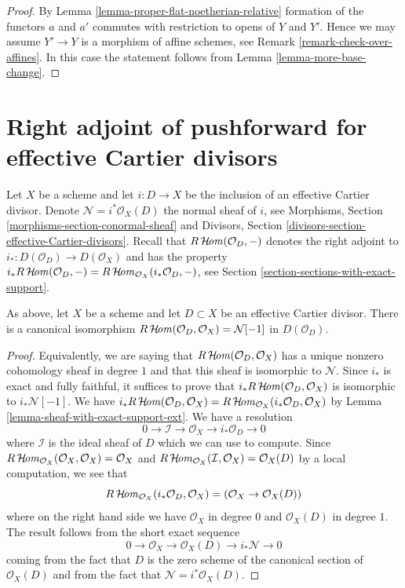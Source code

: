 \begin{proof}
By Lemma \ref{lemma-proper-flat-noetherian-relative} formation of the
functors $a$ and $a'$ commutes with restriction to opens of $Y$ and $Y'$.
Hence we may assume $Y' \to Y$ is a morphism of affine schemes, see
Remark \ref{remark-check-over-affines}. In this
case the statement follows from Lemma \ref{lemma-more-base-change}.
\end{proof}



\section{Right adjoint of pushforward for effective Cartier divisors}
\label{section-dualizing-Cartier}

\noindent
Let $X$ be a scheme and let $i : D \to X$ be the inclusion of an
effective Cartier divisor. Denote $\mathcal{N} = i^*\mathcal{O}_X(D)$
the normal sheaf of $i$, see
Morphisms, Section \ref{morphisms-section-conormal-sheaf}
and
Divisors, Section \ref{divisors-section-effective-Cartier-divisors}.
Recall that $R\mathop{\mathcal{H}\!\mathit{om}}\nolimits(\mathcal{O}_D, -)$
denotes the right adjoint to $i_* : D(\mathcal{O}_D) \to D(\mathcal{O}_X)$
and has the property
$i_*R\mathop{\mathcal{H}\!\mathit{om}}\nolimits(\mathcal{O}_D, -) =
R\mathop{\mathcal{H}\!\mathit{om}}\nolimits_{\mathcal{O}_X}(i_*\mathcal{O}_D, -)$,
see Section \ref{section-sections-with-exact-support}.

\begin{lemma}
\label{lemma-compute-for-effective-Cartier}
As above, let $X$ be a scheme and let $D \subset X$ be an
effective Cartier divisor. There is a canonical isomorphism
$R\mathop{\mathcal{H}\!\mathit{om}}\nolimits(\mathcal{O}_D, \mathcal{O}_X) = \mathcal{N}[-1]$
in $D(\mathcal{O}_D)$.
\end{lemma}

\begin{proof}
Equivalently, we are saying that $R\mathop{\mathcal{H}\!\mathit{om}}\nolimits(\mathcal{O}_D, \mathcal{O}_X)$
has a unique nonzero cohomology sheaf in degree $1$ and that this
sheaf is isomorphic to $\mathcal{N}$. Since $i_*$ is exact and fully
faithful, it suffices to prove that
$i_*R\mathop{\mathcal{H}\!\mathit{om}}\nolimits(\mathcal{O}_D, \mathcal{O}_X)$ is isomorphic
to $i_*\mathcal{N}[-1]$. We have
$i_*R\mathop{\mathcal{H}\!\mathit{om}}\nolimits(\mathcal{O}_D, \mathcal{O}_X) =
R\mathop{\mathcal{H}\!\mathit{om}}\nolimits_{\mathcal{O}_X}(i_*\mathcal{O}_D, \mathcal{O}_X)$
by Lemma \ref{lemma-sheaf-with-exact-support-ext}. We have a resolution
$$
0 \to \mathcal{I} \to \mathcal{O}_X \to i_*\mathcal{O}_D \to 0
$$
where $\mathcal{I}$ is the ideal sheaf of $D$
which we can use to compute. Since
$R\mathop{\mathcal{H}\!\mathit{om}}\nolimits_{\mathcal{O}_X}(\mathcal{O}_X, \mathcal{O}_X) = \mathcal{O}_X$ and
$R\mathop{\mathcal{H}\!\mathit{om}}\nolimits_{\mathcal{O}_X}(\mathcal{I}, \mathcal{O}_X) = \mathcal{O}_X(D)$ by
a local computation, we see that
$$
R\mathop{\mathcal{H}\!\mathit{om}}\nolimits_{\mathcal{O}_X}(i_*\mathcal{O}_D, \mathcal{O}_X) =
(\mathcal{O}_X \to \mathcal{O}_X(D))
$$
where on the right hand side we have $\mathcal{O}_X$ in degree $0$
and $\mathcal{O}_X(D)$ in degree $1$. The result follows from the
short exact sequence
$$
0 \to \mathcal{O}_X \to \mathcal{O}_X(D) \to i_*\mathcal{N} \to 0
$$
coming from the fact that $D$ is the zero scheme of the canonical section
of $\mathcal{O}_X(D)$ and from the fact that
$\mathcal{N} = i^*\mathcal{O}_X(D)$.
\end{proof}

